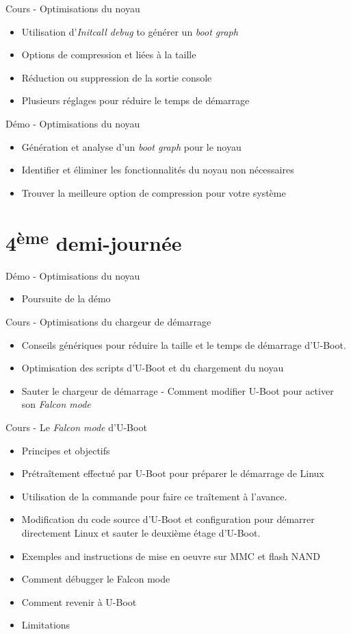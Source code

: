 \documentclass[a4paper,12pt,obeyspaces,spaces,hyphens]{article}
\begin{document}
\feagendatwocolumn
{Cours - Optimisations du noyau}
{
  \begin{itemize}
  \item Utilisation d'{\em Initcall debug} to générer un {\em boot graph}
  \item Options de compression et liées à la taille
  \item Réduction ou suppression de la sortie console
  \item Plusieurs réglages pour réduire le temps de démarrage
  \end{itemize}
}
{Démo - Optimisations du noyau}
{
 \begin{itemize}
 \item Génération et analyse d'un {\em boot graph} pour le noyau
 \item Identifier et éliminer les fonctionnalités du noyau non nécessaires
 \item Trouver la meilleure option de compression pour votre système
 \end{itemize}
}

\section{4\textsuperscript{ème} demi-journée}

\feagendaonecolumn
{Démo - Optimisations du noyau}
{
 \begin{itemize}
 \item Poursuite de la démo
 \end{itemize}
}

\feagendatwocolumn
{Cours - Optimisations du chargeur de démarrage}
{
  \begin{itemize}
  \item Conseils génériques pour réduire la taille et le temps
        de démarrage d'U-Boot.
  \item Optimisation des scripts d'U-Boot et du chargement du noyau
  \item Sauter le chargeur de démarrage - Comment modifier U-Boot pour
	activer son {\em Falcon mode}
  \end{itemize}
}
{Cours - Le {\em Falcon mode} d'U-Boot}
{
  \begin{itemize}
  \item Principes et objectifs
  \item Prétraîtement effectué par U-Boot pour préparer le démarrage de Linux
  \item Utilisation de la commande  pour faire ce traîtement à l'avance.
  \item Modification du code source d'U-Boot et configuration pour démarrer directement
        Linux et sauter le deuxième étage d'U-Boot.
  \item Exemples and instructions de mise en oeuvre sur MMC et flash NAND
  \item Comment débugger le Falcon mode
  \item Comment revenir à U-Boot
  \item Limitations
  \end{itemize}
}
\end{document}
